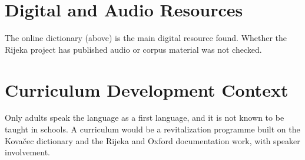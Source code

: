 \documentclass[12pt]{article}
\begin{document}
\section{Digital and Audio Resources}
The online dictionary (above) is the main digital resource found. Whether the Rijeka project has published audio or corpus material was not checked.

\section{Curriculum Development Context}
Only adults speak the language as a first language, and it is not known to be taught in schools. A curriculum would be a revitalization programme built on the Kova\v{c}ec dictionary and the Rijeka and Oxford documentation work, with speaker involvement.
\end{document}
